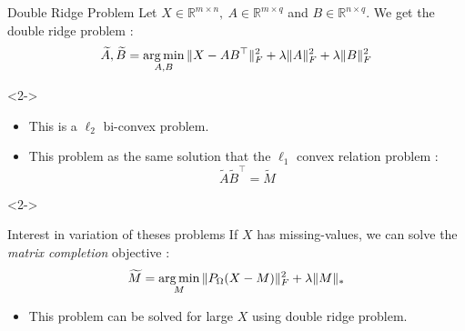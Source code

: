 \documentclass[10pt,aspectratio=43]{beamer}
\begin{document}
\begin{frame}{Double Ridge Problem}{}
    Let $X \in \mathbb{R}^{m\times n },~  A \in \mathbb{R}^{m\times q}$ and $B \in \mathbb{R}^{n \times q }$. We get the double ridge problem :
    $$ \widetilde{A}, \widetilde{B} =  \mathop{\mathrm{arg\,min}}_{A, B} \|X-AB^\top \|_F^2 + \lambda \|A \|_F^2 +\lambda \|B \|_F^2 $$
    \begin{onlyenv}<2->
        \begin{itemize}
            \item This is a $\ell_2$ bi-convex problem.
            \item This problem as  the same solution that the $\ell_1$ convex relation problem  :
            $$ \widetilde{A} \widetilde{B}^\top = \widetilde{M} $$
        \end{itemize}
    \end{onlyenv}
    \begin{onlyenv}<2->
        \begin{block}{Interest in variation of theses  problems}
            If $X$ has missing-values, we can solve the \textit{matrix completion} objective :
            $$\widetilde{M} = \mathop{\mathrm{arg\,min}}_{M} \|P_\Omega (X-M)\|_F^2 + \lambda \|M\|_*$$
        \end{block}
        \begin{itemize}
            \item This problem can be solved for large $X$ using double ridge problem.
        \end{itemize}
    \end{onlyenv}
\end{frame}




\begin{frame}
    
\end{frame}
\end{document}
